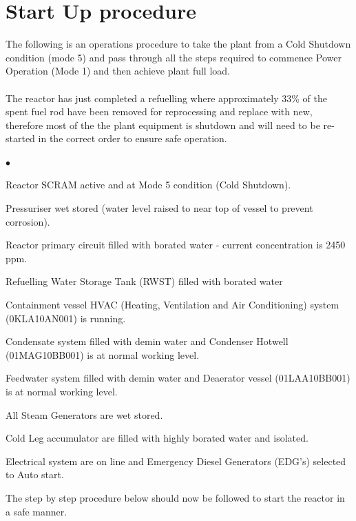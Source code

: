 \documentclass[10pt,a4paper]{article}
\begin{document}
\section*{Start Up procedure}
The following is an operations procedure to take the plant from a Cold Shutdown condition (mode 5) and pass through all the steps required to commence Power Operation (Mode 1) and then achieve plant full load.\\
\\
The reactor has just completed a refuelling where approximately 33\% of the spent fuel rod have been removed for reprocessing and replace with new, therefore most of the the plant equipment is shutdown and will need to be re-started in the correct order to ensure safe operation.
\begin{list}{$\bullet$}{}
\item Reactor SCRAM active and at Mode 5 condition (Cold Shutdown).
\item Pressuriser wet stored (water level raised to near top of vessel to prevent corrosion).
\item Reactor primary circuit filled with borated water - current concentration is 2450 ppm.
\item Refuelling Water Storage Tank (RWST) filled with borated water
\item Containment vessel HVAC (Heating, Ventilation and Air Conditioning) system (0KLA10AN001) is running.
\item Condensate system filled with demin water and Condenser Hotwell (01MAG10BB001) is at normal working level.
\item Feedwater system filled with demin water and Deaerator vessel (01LAA10BB001) is at normal working level.
\item All Steam Generators are wet stored.
\item Cold Leg accumulator are filled with highly borated water and isolated.
\item Electrical system are on line and Emergency Diesel Generators (EDG's) selected to Auto start.
\end{list}
The step by step procedure below should now be followed to start the reactor in a safe manner.
\end{document}
